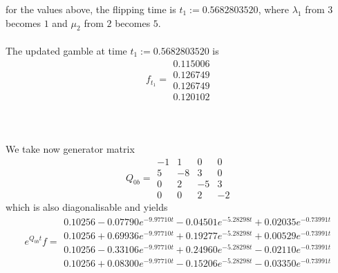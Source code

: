 \documentclass{article}
\begin{document}
for the values above, the flipping time is $t_{1}:= 0.5682803520$, where $\lambda_{1}$ from $3$ becomes $1$ and $\mu_{2}$ from $2$ becomes $5$.\\\\
The updated gamble at time $t_{1}:= 0.5682803520$ is
\begin{equation*}  
 f_{t_1}= 
 \begin{array}{|c|}
  0.115006\\
  0.126749\\
  0.126749\\
  0.120102  
 \end{array}
 \end{equation*}\\\\\\
We take now generator matrix 
\begin{equation*} 
 Q_{0b}= 
 \begin{array}{|rrrr|}
  -1 & 1 & 0 & 0 \\
  5 & -8 & 3 & 0 \\
  0 & 2 & -5 & 3 \\
  0 & 0 & 2 & -2 
 \end{array}
 \end{equation*}
 which is also diagonalisable and yields
\begin{equation*} 
 e^{Q_{0b}t}f= 
 \begin{array}{|r|}
  0.10256-0.07790e^{-9.97710t}- 0.04501e^{-5.28298t}+ 0.02035e^{-0.73991t}\\
  0.10256+0.69936e^{-9.97710t}+ 0.19277e^{-5.28298t}+ 0.00529e^{-0.73991t}\\
  0.10256-0.33106e^{-9.97710t}+ 0.24960e^{-5.28298t}- 0.02110e^{-0.73991t}\\
  0.10256+0.08300e^{-9.97710t}- 0.15206e^{-5.28298t}- 0.03350e^{-0.73991t}  
 \end{array}
 \end{equation*}
\end{document}
